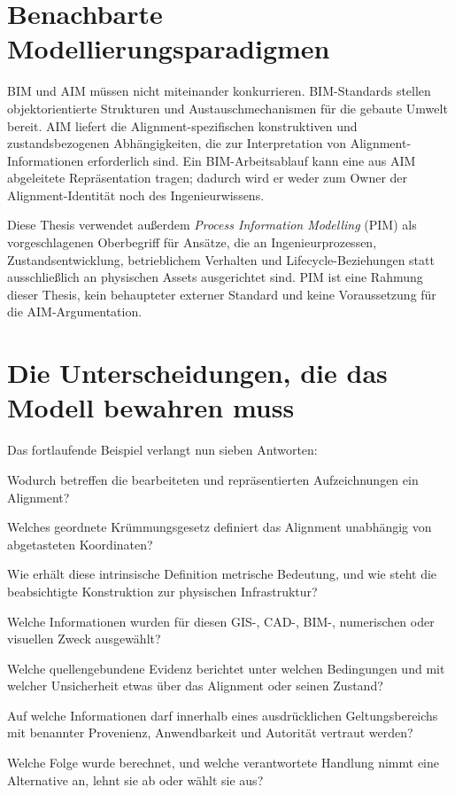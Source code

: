\section{Benachbarte Modellierungsparadigmen}

BIM und AIM müssen nicht miteinander konkurrieren. BIM-Standards stellen
objektorientierte Strukturen und Austauschmechanismen für die gebaute Umwelt
bereit. AIM liefert die Alignment-spezifischen konstruktiven und
zustandsbezogenen Abhängigkeiten, die zur Interpretation von
Alignment-Informationen erforderlich sind. Ein BIM-Arbeitsablauf kann eine aus
AIM abgeleitete Repräsentation tragen; dadurch wird er weder zum Owner der
Alignment-Identität noch des Ingenieurwissens.

Diese Thesis verwendet außerdem \emph{Process Information Modelling} (PIM) als
vorgeschlagenen Oberbegriff für Ansätze, die an Ingenieurprozessen,
Zustandsentwicklung, betrieblichem Verhalten und Lifecycle-Beziehungen statt
ausschließlich an physischen Assets ausgerichtet sind. PIM ist eine Rahmung
dieser Thesis, kein behaupteter externer Standard und keine Voraussetzung für
die AIM-Argumentation.

\section{Die Unterscheidungen, die das Modell bewahren muss}

Das fortlaufende Beispiel verlangt nun sieben Antworten:

\begin{description}[style=nextline]
\item[Objektidentität]
Wodurch betreffen die bearbeiteten und repräsentierten Aufzeichnungen ein
Alignment?
\item[Konstruktive Definition]
Welches geordnete Krümmungsgesetz definiert das Alignment unabhängig von
abgetasteten Koordinaten?
\item[Realisierung]
Wie erhält diese intrinsische Definition metrische Bedeutung, und wie steht
die beabsichtigte Konstruktion zur physischen Infrastruktur?
\item[Repräsentation]
Welche Informationen wurden für diesen GIS-, CAD-, BIM-, numerischen oder
visuellen Zweck ausgewählt?
\item[Beobachtung]
Welche quellengebundene Evidenz berichtet unter welchen Bedingungen und mit
welcher Unsicherheit etwas über das Alignment oder seinen Zustand?
\item[Wissen]
Auf welche Informationen darf innerhalb eines ausdrücklichen Geltungsbereichs
mit benannter Provenienz, Anwendbarkeit und Autorität vertraut werden?
\item[Bewertung und Entscheidung]
Welche Folge wurde berechnet, und welche verantwortete Handlung nimmt eine
Alternative an, lehnt sie ab oder wählt sie aus?
\end{description}


